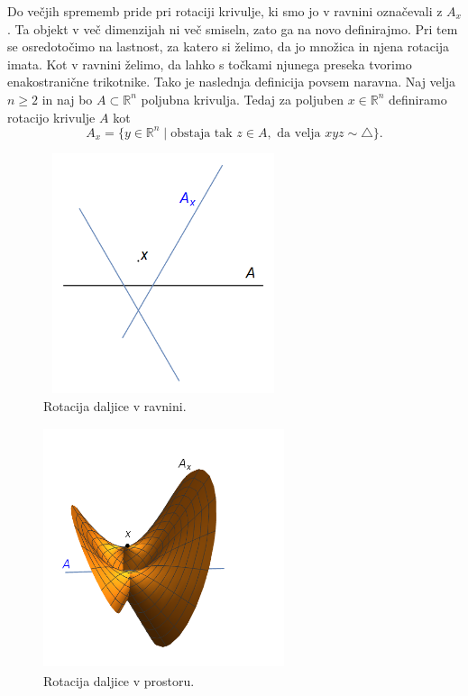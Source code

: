 \documentclass[mat1]{fmfdelo}
\newcommand{\R}{\mathbb R}
\begin{document}
Do večjih sprememb pride pri rotaciji krivulje, ki smo jo v ravnini označevali z $A_x$. Ta objekt v več dimenzijah ni več smiseln, zato ga na novo definirajmo. Pri tem se osredotočimo na lastnost, za katero si želimo, da jo množica in njena rotacija imata. Kot v ravnini želimo, da lahko s točkami njunega preseka tvorimo enakostranične trikotnike. Tako je naslednja definicija povsem naravna. Naj velja $n \geq 2$ in naj bo $A \subset \R^n$ poljubna krivulja. Tedaj za poljuben $x \in \R^n$ definiramo rotacijo krivulje $A$ kot 
\[ A_x = \{y \in \R^n \mid \text{obstaja tak } z \in A, \text{ da velja } xyz \sim \triangle \}. \]

\begin{figure}[h!]
\centering
\includegraphics[width = 200pt, height = 200pt]{rotacija_druga_ravnina.png}
\caption{Rotacija daljice v ravnini.}
\label{fig:rotacija_sprem_ravnina}
\end{figure}

\begin{figure}[h!]
\centering
\includegraphics[width = 200pt, height = 200pt]{rotacija_druga_prostor.png}
\caption{Rotacija daljice v prostoru.}
\label{fig:rotacija_sprem_prostor}
\end{figure}
\end{document}
